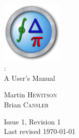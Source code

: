 \begin{titlepage}
	\begin{center}
		\includegraphics[width=3cm]{TeXnicle-Images/texnicle-icon.png}\\[2cm]
		{\Huge \texnicle:}\\[1cm]
		{\huge A User's Manual}\\[4cm]
	\end{center}

\begin{large}
	\begin{center}
		Martin \textsc{Hewitson}\\[0.5in]
		Brian \textsc{Cansler}
	\end{center}
\end{large}

	\vfill
	\begin{center}
		{\large Issue 1, Revision 1}\\[0.25cm]
		{\large Last revised \today}
	\end{center}
\end{titlepage}